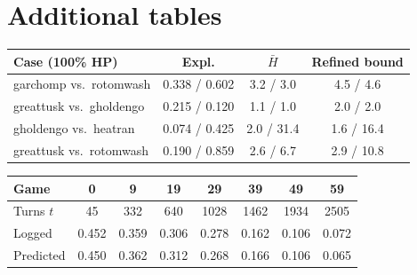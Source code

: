 \documentclass[10pt]{article}
\theoremstyle{plain}
\theoremstyle{definition}
\theoremstyle{remark}
\newcommand{\Hbar}{\bar H}
\begin{document}
\section{Additional tables}
\label{app:tables}
\begin{table}[h]
\centering\small
\begin{minipage}[t]{0.49\linewidth}\centering
{}
\label{tab:endgame}
\footnotesize\setlength{\tabcolsep}{2.5pt}\begin{tabular}{@{}lccc@{}}
\toprule
Case (100\% HP) & Expl. & $\Hbar$ & Refined bound \\
\midrule
garchomp vs.\ rotomwash & 0.338 / 0.602 & 3.2 / 3.0 & 4.5 / 4.6 \\
greattusk vs.\ gholdengo & 0.215 / 0.120 & 1.1 / 1.0 & 2.0 / 2.0 \\
gholdengo vs.\ heatran & 0.074 / 0.425 & 2.0 / 31.4 & 1.6 / 16.4 \\
greattusk vs.\ rotomwash & 0.190 / 0.859 & 2.6 / 6.7 & 2.9 / 10.8 \\
\bottomrule
\end{tabular}
\end{minipage}\hfill
\begin{minipage}[t]{0.48\linewidth}\centering\setlength{\tabcolsep}{2.5pt}
\label{tab:r3b}
\begin{tabular}{@{}lccccccc@{}}
\toprule
Game & 0 & 9 & 19 & 29 & 39 & 49 & 59 \\
\midrule
Turns $t$ & 45 & 332 & 640 & 1028 & 1462 & 1934 & 2505 \\
Logged & 0.452 & 0.359 & 0.306 & 0.278 & 0.162 & 0.106 & 0.072 \\
Predicted & 0.450 & 0.362 & 0.312 & 0.268 & 0.166 & 0.106 & 0.065 \\
\bottomrule
\end{tabular}
\end{minipage}
\end{table}
\end{document}
